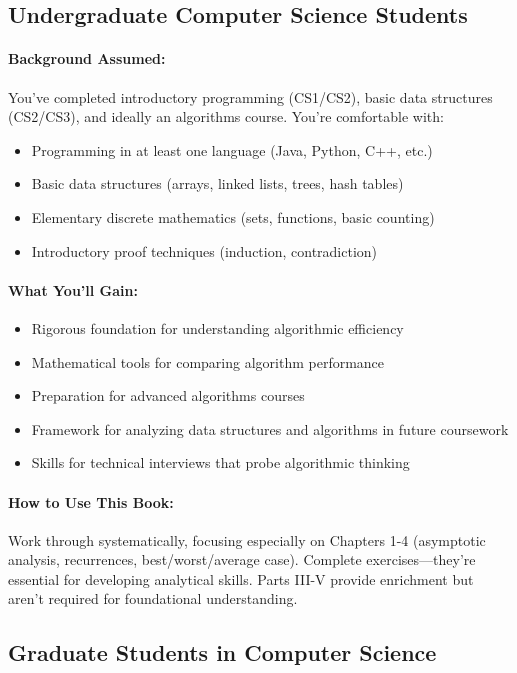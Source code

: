\subsection{Undergraduate Computer Science Students}

\paragraph{Background Assumed:}
You've completed introductory programming (CS1/CS2), basic data structures (CS2/CS3), and ideally an algorithms course. You're comfortable with:
\begin{itemize}
    \item Programming in at least one language (Java, Python, C++, etc.)
    \item Basic data structures (arrays, linked lists, trees, hash tables)
    \item Elementary discrete mathematics (sets, functions, basic counting)
    \item Introductory proof techniques (induction, contradiction)
\end{itemize}

\paragraph{What You'll Gain:}
\begin{itemize}
    \item Rigorous foundation for understanding algorithmic efficiency
    \item Mathematical tools for comparing algorithm performance
    \item Preparation for advanced algorithms courses
    \item Framework for analyzing data structures and algorithms in future coursework
    \item Skills for technical interviews that probe algorithmic thinking
\end{itemize}

\paragraph{How to Use This Book:}
Work through systematically, focusing especially on Chapters 1-4 (asymptotic analysis, recurrences, best/worst/average case). Complete exercises—they're essential for developing analytical skills. Parts III-V provide enrichment but aren't required for foundational understanding.

\subsection{Graduate Students in Computer Science}

